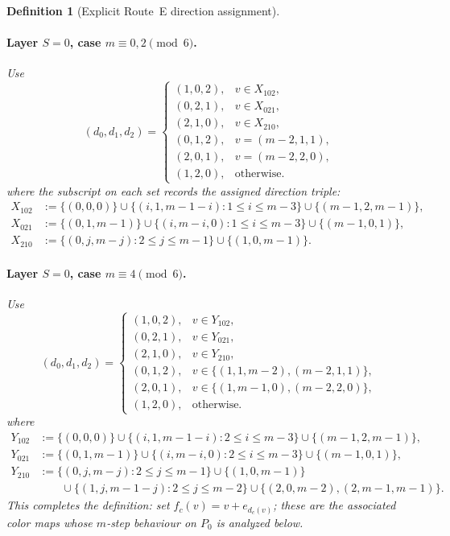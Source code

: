 \documentclass[11pt]{article}
\newtheorem{definition}{Definition}
\begin{document}
\begin{definition}[Explicit Route~E direction assignment]
\paragraph{Layer $S=0$, case $m\equiv 0,2\pmod 6$.}
Use
\[
(d_0,d_1,d_2)=
\begin{cases}
(1,0,2), & v\in X_{102},\\
(0,2,1), & v\in X_{021},\\
(2,1,0), & v\in X_{210},\\
(0,1,2), & v=(m-2,1,1),\\
(2,0,1), & v=(m-2,2,0),\\
(1,2,0), & \text{otherwise.}
\end{cases}
\]
\smallskip\noindent
where the subscript on each set records the assigned direction triple:
\begin{align*}
X_{102}&:=\{(0,0,0)\}\cup\{(i,1,m-1-i):1\le i\le m-3\}\cup\{(m-1,2,m-1)\},\\
X_{021}&:=\{(0,1,m-1)\}\cup\{(i,m-i,0):1\le i\le m-3\}\cup\{(m-1,0,1)\},\\
X_{210}&:=\{(0,j,m-j):2\le j\le m-1\}\cup\{(1,0,m-1)\}.
\end{align*}

\paragraph{Layer $S=0$, case $m\equiv 4\pmod 6$.}
Use
\[
(d_0,d_1,d_2)=
\begin{cases}
(1,0,2), & v\in Y_{102},\\
(0,2,1), & v\in Y_{021},\\
(2,1,0), & v\in Y_{210},\\
(0,1,2), & v\in\{(1,1,m-2),(m-2,1,1)\},\\
(2,0,1), & v\in\{(1,m-1,0),(m-2,2,0)\},\\
(1,2,0), & \text{otherwise.}
\end{cases}
\]
where
\begin{align*}
Y_{102}&:=\{(0,0,0)\}\cup\{(i,1,m-1-i):2\le i\le m-3\}\cup\{(m-1,2,m-1)\},\\
Y_{021}&:=\{(0,1,m-1)\}\cup\{(i,m-i,0):2\le i\le m-3\}\cup\{(m-1,0,1)\},\\
Y_{210}&:=\{(0,j,m-j):2\le j\le m-1\}\cup\{(1,0,m-1)\}\\
&\hspace{2em}\cup\{(1,j,m-1-j):2\le j\le m-2\}\cup\{(2,0,m-2),(2,m-1,m-1)\}.
\end{align*}
This completes the definition: set $f_c(v)=v+e_{d_c(v)}$; these are the associated color maps whose $m$-step behaviour on $P_0$ is analyzed below.
\end{definition}
\end{document}
